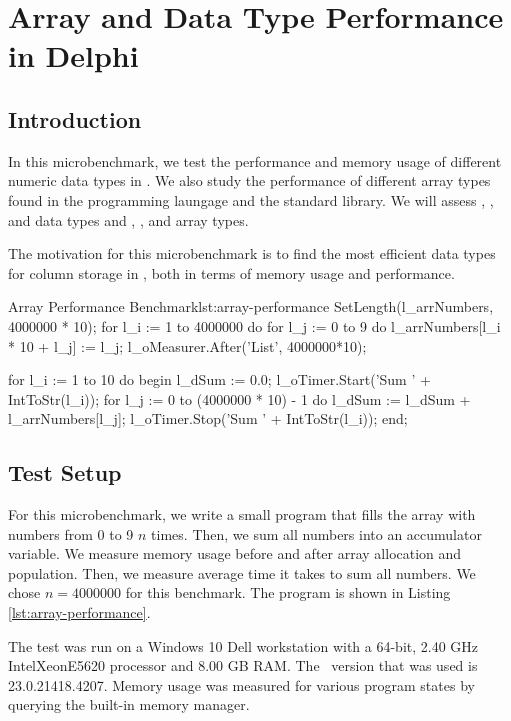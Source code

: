 \chapter{Array and Data Type Performance in Delphi}
\label{app:array-performance}

\section{Introduction}
\label{sec:Introduction}
In this microbenchmark, we test the performance and memory usage of different numeric data types in \delphi. We also study the performance of different array types found in the programming laungage and the standard library. We will assess , , and  data types and , , and  array types.

The motivation for this microbenchmark is to find the most efficient data types for column storage in \gap, both in terms of memory usage and performance.

\begin{minipage}{\linewidth}
\begin{delphicode}{Array Performance Benchmark}{lst:array-performance}
  SetLength(l_arrNumbers, 4000000 * 10);
  for l_i := 1 to 4000000 do
    for l_j := 0 to 9 do
      l_arrNumbers[l_i * 10 + l_j] := l_j;
  l_oMeasurer.After('List', 4000000*10);

  for l_i := 1 to 10 do
  begin
    l_dSum := 0.0;
    l_oTimer.Start('Sum ' + IntToStr(l_i));
    for l_j := 0 to (4000000 * 10) - 1 do
      l_dSum := l_dSum + l_arrNumbers[l_j];
    l_oTimer.Stop('Sum ' + IntToStr(l_i));
  end;
\end{delphicode}
\end{minipage}
\section{Test Setup}
\label{sec:Test Setup}
For this microbenchmark, we write a small program that fills the array with numbers from 0 to 9 $n$ times. Then, we sum all numbers into an accumulator variable. We measure memory usage before and after array allocation and population. Then, we measure average time it takes to sum all numbers. We chose $n = 4000000$ for this benchmark. The program is shown in Listing \ref{lst:array-performance}.

The test was run on a Windows 10 Dell workstation with a 64-bit, 2.40 GHz Intel\textregistered Xeon\textregistered E5620 processor and 8.00 GB RAM. The \delphi~version that was used is 23.0.21418.4207. Memory usage was measured for various program states by querying the built-in  memory manager.

